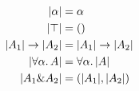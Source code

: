 
\begin{align*}
  \lvert \alpha \rvert                    &= \alpha \\
  \lvert \top \rvert                      &= () \\
  \lvert A_1 \rvert \to \lvert A_2 \rvert &= \lvert A_1 \rvert \to \lvert A_2 \rvert \\
  \lvert \forall \alpha.\, A \rvert        &= \forall \alpha.\, \lvert A \rvert \\
  \lvert A_1 \& A_2 \rvert &= (\lvert A_1 \rvert, \lvert A_2 \rvert) \\
\end{align*}
